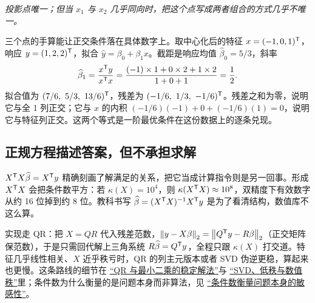 \begin{center}
\end{center}

\emph{投影点唯一；但当 \(x_1\) 与 \(x_2\) 几乎同向时，把这个点写成两者组合的方式几乎不唯一。}

三个点的手算能让正交条件落在具体数字上。取中心化后的特征 \(x=(-1,0,1)^{\mathsf{T}}\)，响应 \(y=(1,2,2)^{\mathsf{T}}\)，拟合 \(\widehat y=\beta_0+\beta_1x\)。截距是响应均值 \(\widehat\beta_0=5/3\)，斜率
\[
\widehat\beta_1=\frac{x^{\mathsf{T}}y}{x^{\mathsf{T}}x}
=\frac{(-1)\times 1+0\times 2+1\times 2}{1+0+1}=\frac12 .
\]
拟合值为 \((7/6,\ 5/3,\ 13/6)^{\trans}\)，残差为 \((-1/6,\ 1/3,\ -1/6)^{\trans}\)。残差之和为零，说明它与全 1 列正交；它与 \(x\) 的内积 \((-1/6)(-1)+0+(-1/6)(1)=0\)，说明它与特征列正交。这两个等式是一阶最优条件在这份数据上的逐条兑现。

\subsection{正规方程描述答案，但不承担求解}

\(X^{\mathsf{T}}X\widehat\beta=X^{\mathsf{T}}y\) 精确刻画了解满足的关系，把它当成计算指令则是另一回事。形成 \(X^{\mathsf{T}}X\) 会把条件数平方：若 \(\kappa(X)=10^4\)，则 \(\kappa(X^{\mathsf{T}}X)\approx 10^8\)，双精度下有效数字从约 16 位掉到约 8 位。教科书写 \(\widehat\beta=(X^{\mathsf{T}}X)^{-1}X^{\mathsf{T}}y\) 是为了看清结构，数值库不这么算。

实现走 QR：把 \(X=QR\) 代入残差范数，\(\left\lVert y-X\beta\right\rVert_2=\left\lVert Q^{\mathsf{T}}y-R\beta\right\rVert_2\)（正交矩阵保范数），于是只需回代解上三角系统 \(R\widehat\beta=Q^{\mathsf{T}}y\)，全程只跟 \(\kappa(X)\) 打交道。特征几乎线性相关、\(X\) 近乎秩亏时，QR 的列主元版本或者 SVD 伪逆更稳，算起来也更慢。这条路线的细节在 \hyperref[sec:08-Numerical-Analysis/05-Numerical-Linear-Algebra/02]{``QR 与最小二乘的稳定解法''}与 \hyperref[sec:08-Numerical-Analysis/05-Numerical-Linear-Algebra/06]{``SVD、低秩与数值秩''}里；条件数为什么衡量的是问题本身而非算法，见 \hyperref[sec:08-Numerical-Analysis/01-Floating-Point-and-Error/03]{``条件数衡量问题本身的敏感性''}。

